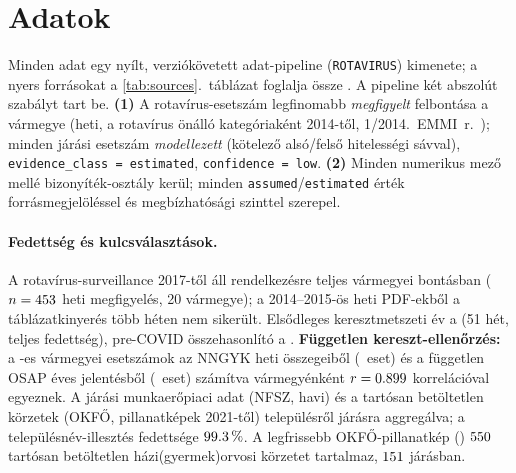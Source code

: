 \documentclass[11pt,a4paper]{article}
\begin{document}
\section{Adatok}

Minden adat egy nyílt, verziókövetett adat-pipeline (\texttt{ROTAVIRUS})
kimenete; a nyers forrásokat a \ref{tab:sources}.~táblázat foglalja össze
\citep{nngyk_epinfo,nngyk_osap,nfsz_stat,okfo_korzet,ksh_stadat,ksh_nepszamlalas}.
A pipeline két abszolút szabályt tart be. \textbf{(1)} A rotavírus-esetszám
legfinomabb \emph{megfigyelt} felbontása a vármegye (heti, a rotavírus önálló
kategóriaként 2014-től, 1/2014.~EMMI~r.\ \citep{emmi12014}); minden járási
esetszám \emph{modellezett} (kötelező alsó/felső hitelességi sávval),
\texttt{evidence\_class = estimated}, \texttt{confidence = low}. \textbf{(2)}
Minden numerikus mező mellé bizonyíték-osztály kerül; minden
\texttt{assumed}/\texttt{estimated} érték forrásmegjelöléssel és
megbízhatósági szinttel szerepel.



\paragraph{Fedettség és kulcsválasztások.}
A rotavírus-surveillance 2017-től áll rendelkezésre teljes vármegyei
bontásban ($n=453$ heti megfigyelés, 20 vármegye); a 2014--2015-ös
heti PDF-ekből a táblázatkinyerés több héten nem sikerült. Elsődleges
keresztmetszeti év a \csYear{} (51 hét, teljes fedettség), pre-COVID
összehasonlító a \preYear{}. \textbf{Független kereszt-ellenőrzés:} a
\csYear-es vármegyei esetszámok az NNGYK heti összegeiből
(\weeklySumTotal{}~eset) és a független OSAP éves jelentésből
(\osapTotal{}~eset) számítva vármegyénként $r=0.899$
korrelációval egyeznek. A járási munkaerőpiaci adat (NFSZ, havi) és a
tartósan betöltetlen körzetek (OKFŐ, pillanatképek 2021-től) településről
járásra aggregálva; a településnév-illesztés fedettsége $99.3\,\%$.
A legfrissebb OKFŐ-pillanatkép (\okfoSnapshot) $550{}$ tartósan
betöltetlen házi(gyermek)orvosi körzetet tartalmaz,
$151{}$ járásban.
\end{document}

